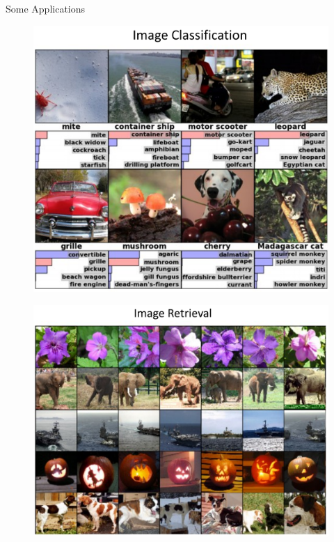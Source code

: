 \documentclass[10pt]{beamer}
\theoremstyle{remark}
\theoremstyle{definition}
\begin{document}
\begin{frame}[allowframebreaks]{Some Applications}
\begin{figure}
\centering
\includegraphics[width=1.0\textwidth,height=0.9\textheight,keepaspectratio]{./images/cv_2.png}
\end{figure}

\framebreak

\begin{figure}
\centering
\includegraphics[width=1.0\textwidth,height=0.9\textheight,keepaspectratio]{./images/cv_3.png}
\end{figure}


\end{frame}
\end{document}
